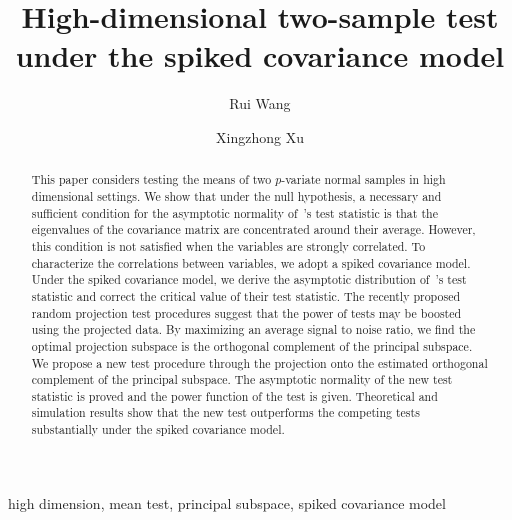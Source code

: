 \documentclass[3p]{elsarticle}
\theoremstyle{plain}
\theoremstyle{definition}
\theoremstyle{remark}
\begin{document}
\begin{frontmatter}

\title{High-dimensional two-sample test under the spiked covariance model}

    \author[mymainaddress]{Rui Wang}
    \author[mymainaddress,mysecondaryaddress]{Xingzhong Xu}
    \address[mymainaddress]{School of Mathematics and Statistics, Beijing Institute of Technology, Beijing 
    100081,China}
    \address[mysecondaryaddress]{Beijing Key Laboratory on MCAACI, Beijing Institute of Technology, Beijing 100081,China}




\begin{abstract}
    This paper considers testing the means of two $p$-variate normal samples in high dimensional settings.
We show that under the null hypothesis, a necessary and sufficient condition for the asymptotic normality of~\cite{Chen2010A}'s test statistic is that the eigenvalues of the covariance matrix are concentrated around their average. However, this condition is not satisfied when the variables are strongly correlated.
    To characterize the correlations between variables, we adopt a spiked covariance model. 
    Under the spiked covariance model, we derive the asymptotic distribution of~\cite{Chen2010A}'s test statistic and correct the critical value of their test statistic.
    The recently proposed random projection test procedures suggest that the power of tests may be boosted using the projected data.
    By maximizing an average signal to noise ratio, we find the optimal projection subspace is the orthogonal complement of the principal subspace. 
    We propose a new test procedure through the projection onto the estimated orthogonal complement of the principal subspace.
    The asymptotic normality of the new test statistic is proved and the power function of the test is given.
    Theoretical and simulation results show that the new test outperforms the competing tests substantially under the spiked covariance model.
\end{abstract}

\begin{keyword}
    high dimension, mean test, principal subspace, spiked covariance model
\end{keyword}

\end{frontmatter}
\end{document}
